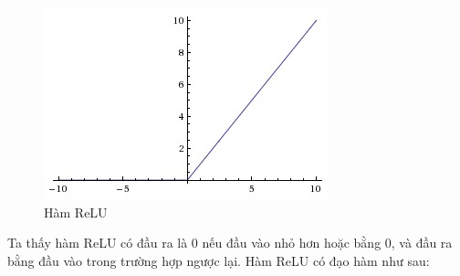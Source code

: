 \begin{enumerate}
\begin{center}
 	\begin{figure}[H]
    \begin{center}
    \includegraphics[scale=0.6]{chap3/image/relu.jpeg}
    \end{center}
    \caption{Hàm ReLU}
    \label{fig:relu}
    \end{figure}
\end{center}
Ta thấy hàm ReLU có đầu ra là 0 nếu đầu vào nhỏ hơn hoặc bằng 0, và đầu ra bằng đầu vào trong trường hợp ngược lại. Hàm ReLU có đạo hàm như sau:
	

\end{enumerate}
